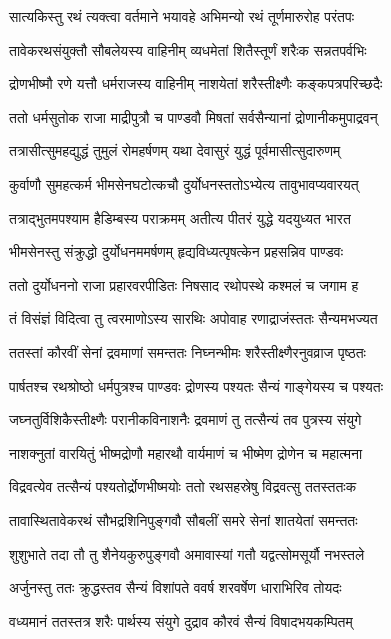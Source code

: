 \twolineshloka
{सात्यकिस्तु रथं त्यक्त्वा वर्तमाने भयावहे}
{अभिमन्यो रथं तूर्णमारुरोह परंतपः}


\twolineshloka
{तावेकरथसंयुक्तौ सौबलेयस्य वाहिनीम्}
{व्यधमेतां शितैस्तूर्णं शरैःक सन्नतपर्वभिः}


\twolineshloka
{द्रोणभीष्मौ रणे यत्तौ धर्मराजस्य वाहिनीम्}
{नाशयेतां शरैस्तीक्ष्णैः कङ्कपत्रपरिच्छदैः}


\twolineshloka
{ततो धर्मसुतोक राजा माद्रीपुत्रौ च पाण्डवौ}
{मिषतां सर्वसैन्यानां द्रोणानीकमुपाद्रवन्}


\twolineshloka
{तत्रासीत्सुमहद्युद्धं तुमुलं रोमहर्षणम्}
{यथा देवासुरं युद्धं पूर्वमासीत्सुदारुणम्}


\twolineshloka
{कुर्वाणौ सुमहत्कर्म भीमसेनघटोत्कचौ}
{दुर्योधनस्ततोऽभ्येत्य तावुभावप्यवारयत्}


\twolineshloka
{तत्राद्भुतमपश्याम हैडिम्बस्य पराक्रमम्}
{अतीत्य पीतरं युद्धे यदयुध्यत भारत}


\twolineshloka
{भीमसेनस्तु संक्रुद्धो दुर्योधनममर्षणम्}
{हृद्यविध्यत्पृषत्केन प्रहसन्निव पाण्डवः}


\twolineshloka
{ततो दुर्योधननो राजा प्रहारवरपीडितः}
{निषसाद रथोपस्थे कश्मलं च जगाम ह}


\twolineshloka
{तं विसंज्ञं विदित्वा तु त्वरमाणोऽस्य सारथिः}
{अपोवाह रणाद्राजंस्ततः सैन्यमभज्यत}


\twolineshloka
{ततस्तां कौरवीं सेनां द्रवमाणां समन्ततः}
{निघ्नन्भीमः शरैस्तीक्ष्णैरनुवव्राज पृष्ठतः}


\twolineshloka
{पार्षतश्च रथश्रोष्ठो धर्मपुत्रश्च पाण्डवः}
{द्रोणस्य पश्यतः सैन्यं गाङ्गेयस्य च पश्यतः}


\twolineshloka
{जघ्नतुर्विशिकैस्तीक्ष्णैः परानीकविनाशनैः}
{द्रवमाणं तु तत्सैन्यं तव पुत्रस्य संयुगे}


\twolineshloka
{नाशक्नुतां वारयितुं भीष्मद्रोणौ महारथौ}
{वार्यमाणं च भीष्मेण द्रोणेन च महात्मना}


\twolineshloka
{विद्रवत्येव तत्सैन्यं पश्यतोर्द्रोणभीष्मयोः}
{ततो रथसहस्रेषु विद्रवत्सु ततस्ततःक}


\twolineshloka
{तावास्थितावेकरथं सौभद्रशिनिपुङ्गवौ}
{सौबलीं समरे सेनां शातयेतां समन्ततः}


\twolineshloka
{शुशुभाते तदा तौ तु शैनेयकुरुपुङ्गवौ}
{अमावास्यां गतौ यद्वत्सोमसूर्यौ नभस्तले}


\twolineshloka
{अर्जुनस्तु ततः क्रुद्धस्तव सैन्यं विशांपते}
{ववर्ष शरवर्षेण धाराभिरिव तोयदः}


\twolineshloka
{वध्यमानं ततस्तत्र शरैः पार्थस्य संयुगे}
{दुद्राव कौरवं सैन्यं विषादभयकम्पितम्}


